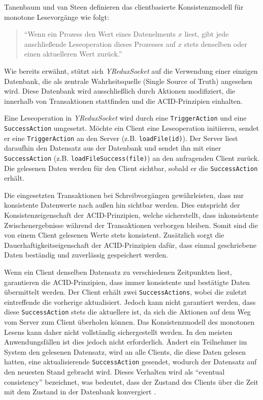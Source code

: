 \documentclass[12pt]{book}          %
\begin{document}
Tanenbaum und van Steen definieren das clientbasierte Konsistenzmodell für monotone Lesevorgänge wie folgt:

\begin{quote}
"`Wenn ein Prozess den Wert eines Datenelments $x$ liest, gibt jede anschließende Leseoperation dieses Prozesses auf $x$ stets denselben oder einen aktuelleren Wert zurück."' \cite[322]{tanenbaum_verteilte_2008}
\end{quote}

Wie bereits erwähnt, stützt sich \textit{YReduxSocket} auf die Verwendung einer einzigen Datenbank, die als zentrale Wahrheitsquelle (Single Source of Truth) angesehen wird. Diese Datenbank wird ausschließlich durch Aktionen modifiziert, die innerhalb von Transaktionen stattfinden und die ACID-Prinzipien einhalten.

Eine Leseoperation in \textit{YReduxSocket} wird durch eine \texttt{TriggerAction} und eine \texttt{SuccessAction} umgesetzt. Möchte ein Client eine Leseoperation initiieren, sendet er eine \texttt{TriggerAction} an den Server (z.B. \texttt{loadFile(id)}). Der Server liest daraufhin den Datensatz aus der Datenbank und sendet ihn mit einer \texttt{SuccessAction} (z.B. \texttt{loadFileSuccess(file)}) an den anfragenden Client zurück. Die gelesenen Daten werden für den Client sichtbar, sobald er die \texttt{SuccessAction} erhält.

Die eingesetzten Transaktionen bei Schreibvorgängen gewährleisten, dass nur konsistente Datenwerte nach außen hin sichtbar werden. Dies entspricht der Konsistenzeigenschaft der ACID-Prinzipien, welche sicherstellt, dass inkonsistente Zwischenergebnisse während der Transaktionen verborgen bleiben. Somit sind die von einem Client gelesenen Werte stets konsistent. Zusätzlich sorgt die Dauerhaftigkeitseigenschaft der ACID-Prinzipien dafür, dass einmal geschriebene Daten beständig und zuverlässig gespeichert werden. 

Wenn ein Client denselben Datensatz zu verschiedenen Zeitpunkten liest, garantieren die ACID-Prinzipien, dass immer konsistente und bestätigte Daten übermittelt werden. Der Client erhält zwei \texttt{SuccessActions}, wobei die zuletzt eintreffende die vorherige aktualisiert. Jedoch kann nicht garantiert werden, dass diese \texttt{SuccessAction} stets die aktuellere ist, da sich die Aktionen auf dem Weg vom Server zum Client überholen können. Das Konsistenzmodell des monotonen Lesens kann daher nicht vollständig sichergestellt werden. In den meisten Anwendungsfällen ist dies jedoch nicht erforderlich. Ändert ein Teilnehmer im System den gelesenen Datensatz, wird an alle Clients, die diese Daten gelesen hatten, eine aktualisierende \texttt{SuccessAction} gesendet, wodurch der Datensatz auf den neuesten Stand gebracht wird. Dieses Verhalten wird als "`eventual consistency"' bezeichnet, was bedeutet, dass der Zustand des Clients über die Zeit mit dem Zustand in der Datenbank konvergiert \cite[319-321]{tanenbaum_verteilte_2008}.
\end{document}
